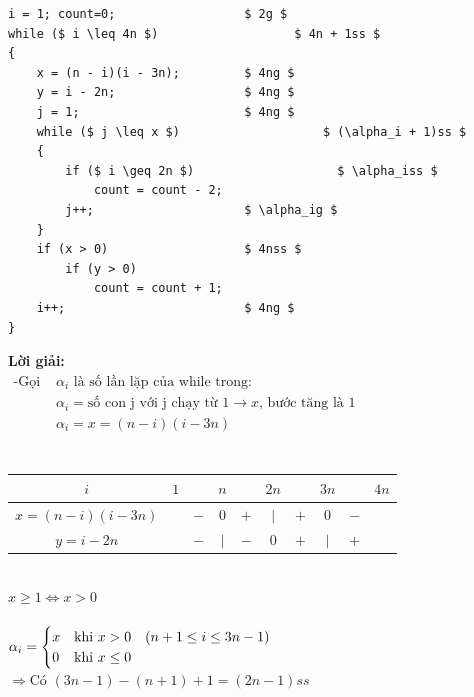 \documentclass[12pt, letterpaper]{article}
\begin{document}
{{{\begin{lstlisting}
i = 1; count=0;                  $ 2g $
while ($ i \leq 4n $)           		$ 4n + 1ss $
{
    x = (n - i)(i - 3n);         $ 4ng $
    y = i - 2n;                  $ 4ng $
    j = 1;                       $ 4ng $
    while ($ j \leq x $)                    $ (\alpha_i + 1)ss $
    {
        if ($ i \geq 2n $)                    $ \alpha_iss $
            count = count - 2;
        j++;                     $ \alpha_ig $
    }
    if (x > 0)                   $ 4nss $
        if (y > 0)
            count = count + 1;
    i++;                         $ 4ng $
}
\end{lstlisting}
\textbf{Lời giải:} \\
$ \begin{aligned}
    \text{-Gọi } & \alpha_i \text{ là số lần lặp của while trong:}                              \\
                & \alpha_i = \text{số con j với j chạy từ 1} \rightarrow x \text{, bước tăng là 1} \\
                & \alpha_i = x = (n-i)(i-3n) \\
\end{aligned} $ \\
 \\
\begin{table}[htb]
    \begin{tabular}{c|c c c c c c c c c}
        $i$ & $1$ &  & $n$ &  & $2n$ &  & $3n$  & & $4n$\\
        \hline
        $x = (n-i)(i-3n)$ &  & $-$ & $0$ & $+$ & $\vert$ & $+$ & $0$ & $-$\\
        \hline
        $y = i - 2n$ &  & $-$ & $\vert$ & $-$ & $0$ & $+$ & $\vert$ & $+$\\
    \end{tabular}
\end{table} \\
 $x \geq 1 \Leftrightarrow x > 0$ \\ \\
$\alpha_i =
\begin{cases}
x &\text{khi } x>0 \quad (n + 1 \leq i \leq 3n - 1)\\
0 &\text{khi } x\leq 0
\end{cases} \\$
 \\
$\Rightarrow \text{Có } (3n - 1) - (n + 1) + 1 = (2n - 1)ss$ \\
}}}
\end{document}
